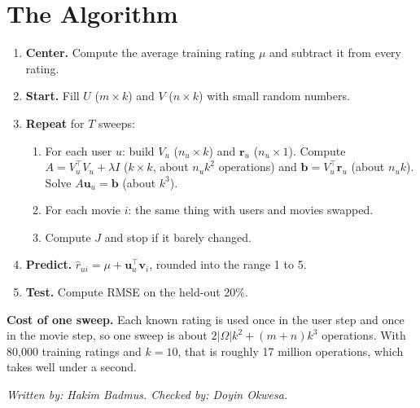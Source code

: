 \documentclass[11pt]{article}
\theoremstyle{definition}
\newcommand{\checked}[2]{\par\smallskip\noindent\textit{Written by: #1. \quad Checked by: #2.}\par}
\begin{document}
\section{The Algorithm}
\begin{enumerate}[label=(\arabic*), start=0]
\item \textbf{Center.} Compute the average training rating $\mu$ and subtract it from every rating.
\item \textbf{Start.} Fill $U$ ($m\times k$) and $V$ ($n\times k$) with small random numbers.
\item \textbf{Repeat} for $T$ sweeps:
  \begin{enumerate}[label=(\alph*)]
  \item For each user $u$: build $V_u$ ($n_u\times k$) and $\mathbf r_u$ ($n_u\times1$). Compute $A=V_u^\top V_u+\lambda I$ ($k\times k$, about $n_uk^2$ operations) and $\mathbf b=V_u^\top\mathbf r_u$ (about $n_uk$). Solve $A\mathbf u_u=\mathbf b$ (about $k^3$).
  \item For each movie $i$: the same thing with users and movies swapped.
  \item Compute $J$ and stop if it barely changed.
  \end{enumerate}
\item \textbf{Predict.} $\hat r_{ui}=\mu+\mathbf u_u^\top\mathbf v_i$, rounded into the range 1 to 5.
\item \textbf{Test.} Compute RMSE on the held-out 20\%.
\end{enumerate}
\textbf{Cost of one sweep.} Each known rating is used once in the user step and once in the movie step, so one sweep is about $2|\Omega|k^2+(m+n)k^3$ operations. With 80{,}000 training ratings and $k=10$, that is roughly 17 million operations, which takes well under a second.
\checked{Hakim Badmus}{Doyin Okwesa}
\end{document}
